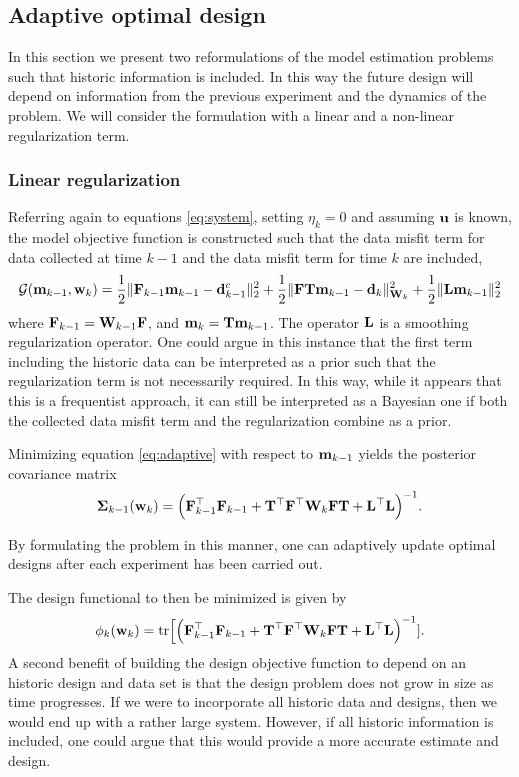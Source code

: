 \documentclass[12pt]{article}
\newcommand{\bfF}	{{\bf{F}}}
\newcommand{\bfL}	{{\bf{L}}}
\newcommand{\bfT}	{{\bf{T}}}
\newcommand{\bfW}	{{\bf{W}}}
\newcommand{\bfd}	{{\bf{d}}}
\newcommand{\bfm}	{{\bf{m}}}
\newcommand{\bfu}	{{\bf{u}}}
\newcommand{\bfw}	{{\bf{w}}}
\newcommand{\hf}        {{\frac 12}}
\newcommand{\bfSigma}   {{\boldsymbol \Sigma}}
\renewcommand{\hf}		 {\frac12}
\begin{document}
\subsection{Adaptive  optimal design}
\label{adaptive}
In this section  we present two reformulations of the model estimation problems such that historic information is included. In this way the future design will depend on information from the previous experiment and the dynamics of the problem. We will consider the formulation with a linear and a non-linear regularization term.

\subsubsection{Linear regularization}
Referring again to equations \eqref{eq:system}, setting $\eta_k = 0$ and assuming $\bfu$ is known, the model objective function is constructed such that the data misfit term for data collected at time $k-1$ and the data misfit term for time $k$ are included,
\begin{equation}
\label{eq:adaptive}
\mathcal{G}(\bfm_{k-1},\bfw_k) = \hf \|\bfF_{k-1}\bfm_{k-1} - \bfd^c_{k-1} \|^2_2 + \hf  \| \bfF \bfT\bfm_{k-1} - \bfd_{k} \|^2_{\bfW_{k}} + \hf \| \bfL\bfm_{k-1} \|^2_2
\end{equation} 
where $\bfF_{k-1} = \bfW_{k-1}\bfF$, and $\bfm_{k} = \bfT \bfm_{k-1}$. The operator $\bfL$ is a smoothing regularization operator. 
One could argue in this instance that the first term including the historic data can be interpreted as a prior such that the regularization term is not necessarily required. In this way, while it appears that this is a frequentist approach, it can still be interpreted as a Bayesian one if both the collected data misfit term and the regularization combine as a prior.

Minimizing equation \eqref{eq:adaptive} with respect to $\bfm_{k-1}$ yields
the posterior covariance matrix 
\begin{equation}
\label{eq:post}
\bfSigma_{k-1}(\bfw_k)= \Big( \bfF_{k-1}^{\top}\bfF_{k-1} +\bfT^{\top} \bfF^{\top} \bfW_k \bfF \bfT + \bfL^{\top}\bfL \Big)^{-1}.
\end{equation}

By formulating the problem in this manner, one can adaptively update optimal designs after each experiment has been carried out.
 
The design functional to then be minimized is given by
%
\begin{equation}
  \label{ABk}
  \phi_k(\bfw_k) = \text{tr}\Big[\Big( \bfF_{k-1}^{\top}\bfF_{k-1} +\bfT^{\top} \bfF^{\top} \bfW_k \bfF \bfT + \bfL^{\top}\bfL \Big)^{-1}].
  \end{equation} 
A second benefit of building the design objective function to depend  on an historic design and data set is that the design problem does not grow in size as time progresses.  If we were to incorporate all historic data and designs, then we would end up with a rather large system. However, if all historic information is included, one could argue that this would provide a more accurate estimate and design.
 
\end{document}
